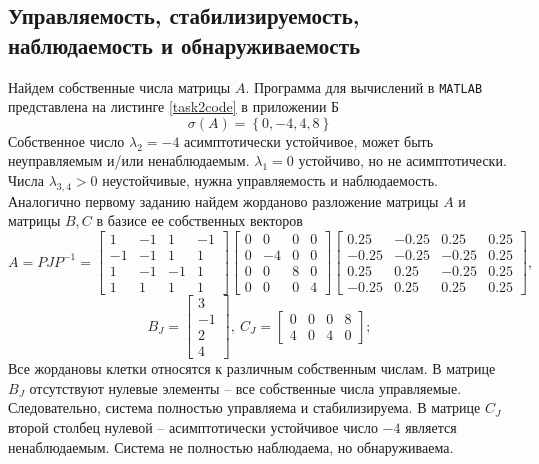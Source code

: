 \documentclass[a4paper, 12pt]{article}
\begin{document}
    \subsection{Управляемость, стабилизируемость, наблюдаемость и обнаруживаемость}
    Найдем собственные числа матрицы $A$. Программа для вычислений в \texttt{MATLAB} представлена на листинге \ref{task2code} в приложении Б
    $$
    \sigma\left( A \right)=\left\{ 0,-4,4,8 \right\}
    $$
    Собственное число $\lambda_2=-4$ асимптотически устойчивое, может быть неуправляемым и/или
    ненаблюдаемым. $\lambda_1=0$ устойчиво, но не асимптотически. Числа $\lambda_{3,4}>0$ неустойчивые,
    нужна управляемость и наблюдаемость.
    Аналогично первому заданию найдем жорданово разложение матрицы $A$ и матрицы $B,C$
    в базисе ее собственных векторов
    $$
    A=PJP^{-1}=\begin{bmatrix}
    1    &-1     &1    &-1\\
    -1    &-1     &1     &1\\
     1    &-1    &-1     &1\\
     1     &1     &1     &1
    \end{bmatrix}\begin{bmatrix}
    0     &0     &0     &0\\
    0    &-4     &0     &0\\
    0     &0     &8     &0\\
    0     &0     &0     &4
    \end{bmatrix}\begin{bmatrix}
    0.25   &-0.25    &0.25    &0.25\\
   -0.25   &-0.25   &-0.25    &0.25\\
    0.25    &0.25   &-0.25    &0.25\\
   -0.25    &0.25    &0.25    &0.25
    \end{bmatrix},
    $$
    $$
    B_J=\begin{bmatrix}
        3\\
    -1\\
     2\\
     4
    \end{bmatrix},\ C_J=\begin{bmatrix}
        0     &0     &0     &8\\
     4     &0     &4     &0
    \end{bmatrix};
    $$
    Все жордановы клетки относятся к различным собственным числам.
    В матрице $B_J$ отсутствуют нулевые элементы -- все собственные числа управляемые. Следовательно,
    система полностью управляема и стабилизируема. В матрице $C_J$ второй столбец нулевой -- асимптотически устойчивое число
    $-4$ является ненаблюдаемым. Система не полностью наблюдаема, но обнаруживаема.
\end{document}

